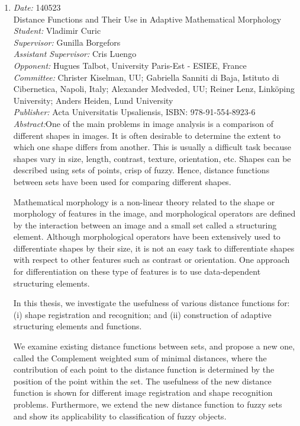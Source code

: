 {\begin{enumerate}
\item
{\em Date:} 140523~\\
{\bf } Distance Functions and Their Use in Adaptive Mathematical Morphology~\\
{\em Student:} Vladimir Curic~\\
{\em Supervisor:} Gunilla Borgefors~\\
{\em Assistant Supervisor:} Cris Luengo\\
{\em Opponent:} Hugues Talbot, University Paris-Est - ESIEE, France~\\
{\em Committee:} Christer Kiselman, UU; 
Gabriella Sanniti di Baja, Istituto di Cibernetica, Napoli, Italy; 
Alexander Medveded, UU; 
Reiner Lenz, Linköping University; 
Anders Heiden, Lund University 
 ~\\
{\em Publisher:} Acta Universitatis Upsaliensis, ISBN: 978-91-554-8923-6~\\ 
{\em Abstract:}One of the main problems in image analysis is a comparison of different shapes in images. It is often desirable to determine the extent to which one shape differs from another. This is usually a difficult task because shapes vary in size, length, contrast, texture, orientation, etc. Shapes can be described using sets of points, crisp of fuzzy. Hence, distance functions between sets have been used for comparing different shapes.

Mathematical morphology is a non-linear theory related to the shape or morphology of features in the image, and morphological operators are defined by the interaction between an image and a small set called a structuring element. Although morphological operators have been extensively used to differentiate shapes by their size, it is not an easy task to differentiate shapes with respect to other features such as contrast or orientation. One approach for differentiation on these type of features is to use data-dependent structuring elements.

In this thesis, we investigate the usefulness of various distance functions for: (i) shape registration and recognition; and (ii) construction of adaptive structuring elements and functions.

We examine existing distance functions between sets, and propose a new one, called the Complement weighted sum of minimal distances, where the contribution of each point to the distance function is determined by the position of the point within the set. The usefulness of the new distance function is shown for different image registration and shape recognition problems. Furthermore, we extend the new distance function to fuzzy sets and show its applicability to classification of fuzzy objects.


\end{enumerate}}
